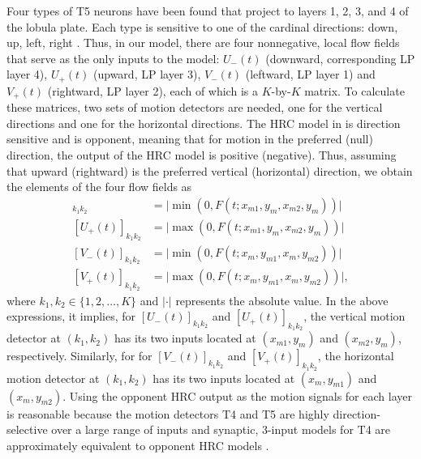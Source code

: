 \documentclass[pdftex,9pt,lineno]{elife}
\begin{document}
Four types of T5 neurons have been found that project to layers 1, 2, 3, and 4 of the lobula plate. Each type is sensitive to one of the cardinal directions: down, up, left, right \citep{maisak2013directional}. Thus, in our model, there are four nonnegative, local flow fields that serve as the only inputs to the model: $U_{-}(t)$ (downward, corresponding LP layer 4), $U_{+}(t)$ (upward, LP layer 3), $V_{-}(t)$ (leftward, LP layer 1) and $V_{+}(t)$ (rightward, LP layer 2), each of which is a $K$-by-$K$ matrix. To calculate these matrices, two sets of motion detectors are needed, one for the vertical directions and one for the horizontal directions. The HRC model in  is direction sensitive and is opponent, meaning that for motion in the preferred (null) direction, the output of the HRC model is positive (negative). Thus, assuming that upward (rightward) is the preferred vertical (horizontal) direction, we obtain the elements of the four flow fields as
\begin{align*}
[U_{-}(t)]_{k_{1}k_{2}} &= \lvert \min(0,F(t;x_{m1},y_{m},x_{m2},y_{m})) \rvert \nonumber \\
[U_{+}(t)]_{k_{1}k_{2}} &= \lvert \max(0,F(t;x_{m1},y_{m},x_{m2},y_{m})) \rvert \nonumber \\
[V_{-}(t)]_{k_{1}k_{2}} &= \lvert \min(0,F(t;x_{m},y_{m1},x_{m},y_{m2})) \rvert  \nonumber \\
[V_{+}(t)]_{k_{1}k_{2}} &= \lvert \max(0,F(t;x_{m},y_{m1},x_{m},y_{m2})) \rvert,
\end{align*}
where $k_{1},k_{2} \in \{1,2,\dots,K\}$ and $\lvert \cdot \rvert$ represents the absolute value. In the above expressions, it implies, for $[U_{-}(t)]_{k_{1}k_{2}}$ and $[U_{+}(t)]_{k_{1}k_{2}}$, the vertical motion detector at $(k_{1},k_{2})$ has its two inputs located at $(x_{m1},y_{m})$ and $(x_{m2},y_{m})$, respectively. Similarly, for for $[V_{-}(t)]_{k_{1}k_{2}}$ and $[V_{+}(t)]_{k_{1}k_{2}}$, the horizontal motion detector at $(k_{1},k_{2})$ has its two inputs located at $(x_{m},y_{m1})$ and $(x_{m},y_{m2})$. Using the opponent HRC output as the motion signals for each layer is reasonable because the motion detectors T4 and T5 are highly direction-selective over a large range of inputs \citep{maisak2013directional, creamer2018} and synaptic, 3-input models for T4 are approximately equivalent to opponent HRC models \citep{zavatone2020minimal}.
\end{document}

